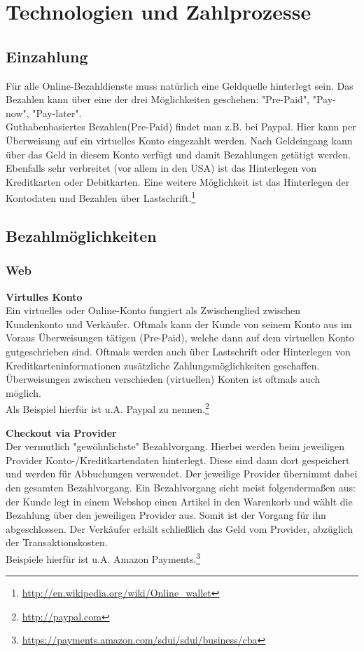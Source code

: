 \section{Technologien und Zahlprozesse}

\subsection{Einzahlung}
Für alle Online-Bezahldienste muss natürlich eine Geldquelle hinterlegt sein. Das Bezahlen kann über eine der drei Möglichkeiten geschehen: "Pre-Paid", "Pay-now", "Pay-later".\\
Guthabenbasiertes Bezahlen(Pre-Paid) findet man z.B. bei Paypal. Hier kann per Überweisung auf ein virtuelles Konto eingezahlt werden. Nach Geldeingang kann über das Geld in diesem Konto verfügt und damit Bezahlungen getätigt werden.
Ebenfalls sehr verbreitet (vor allem in den USA) ist das Hinterlegen von Kreditkarten oder Debitkarten. Eine weitere Möglichkeit ist das Hinterlegen der Kontodaten und Bezahlen über Lastschrift.\footnote{\url{http://en.wikipedia.org/wiki/Online_wallet}}

\subsection{Bezahlmöglichkeiten}
\subsubsection{Web}
\textbf{Virtulles Konto}\\
Ein virtuelles oder Online-Konto fungiert als Zwischenglied zwischen Kundenkonto und Verkäufer. Oftmals kann der Kunde von seinem Konto aus im Voraus Überweisungen tätigen (Pre-Paid), welche dann auf dem virtuellen Konto gutgeschrieben sind. Oftmals werden auch über Lastschrift oder Hinterlegen von Kreditkarteninformationen zusätzliche Zahlungsmöglichkeiten geschaffen.\\
Überweisungen zwischen verschieden (virtuellen) Konten ist oftmals auch möglich.\\
Als Beispiel hierfür ist u.A. Paypal zu nennen.\footnote{\url{http://paypal.com}}

\textbf{Checkout via Provider}\\
Der vermutlich "gewöhnlichste" Bezahlvorgang. Hierbei werden beim jeweiligen Provider Konto-/Kreditkartendaten hinterlegt. Diese sind dann dort gespeichert und werden für Abbuchungen verwendet.
Der jeweilige Provider übernimmt dabei den gesamten Bezahlvorgang. Ein Bezahlvorgang sieht meist folgendermaßen aus: der Kunde legt in einem Webshop einen Artikel in den Warenkorb und wählt die Bezahlung über den jeweiligen Provider aus. Somit ist der Vorgang für ihn abgeschlossen. Der Verkäufer erhält schließlich das Geld vom Provider, abzüglich der Transaktionskosten.\\
Beispiele hierfür ist u.A. Amazon Payments.\footnote{\url{https://payments.amazon.com/sdui/sdui/business/cba}}\\

